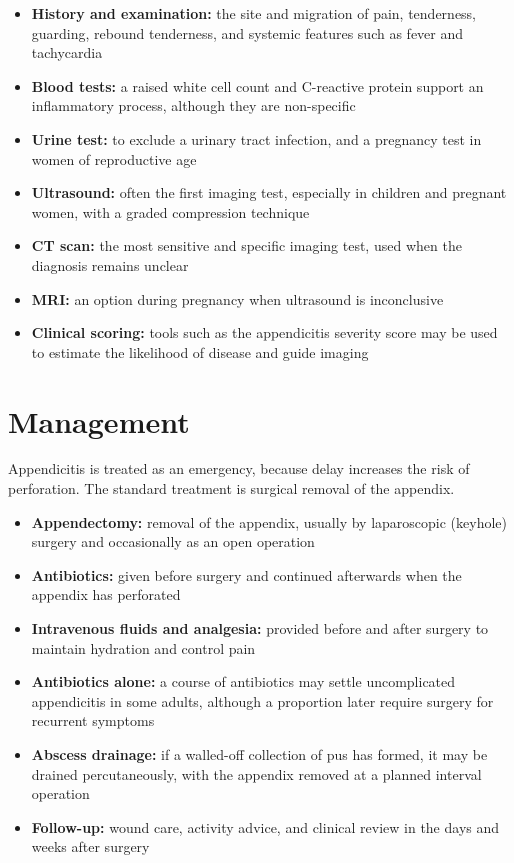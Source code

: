 \begin{itemize}
    \item \textbf{History and examination:} the site and migration of pain, tenderness, guarding, rebound tenderness, and systemic features such as fever and tachycardia
    \item \textbf{Blood tests:} a raised white cell count and C-reactive protein support an inflammatory process, although they are non-specific
    \item \textbf{Urine test:} to exclude a urinary tract infection, and a pregnancy test in women of reproductive age
    \item \textbf{Ultrasound:} often the first imaging test, especially in children and pregnant women, with a graded compression technique
    \item \textbf{CT scan:} the most sensitive and specific imaging test, used when the diagnosis remains unclear
    \item \textbf{MRI:} an option during pregnancy when ultrasound is inconclusive
    \item \textbf{Clinical scoring:} tools such as the appendicitis severity score may be used to estimate the likelihood of disease and guide imaging
\end{itemize}

\section*{Management}
Appendicitis is treated as an emergency, because delay increases the risk of perforation. The standard treatment is surgical removal of the appendix.

\begin{itemize}
    \item \textbf{Appendectomy:} removal of the appendix, usually by laparoscopic (keyhole) surgery and occasionally as an open operation
    \item \textbf{Antibiotics:} given before surgery and continued afterwards when the appendix has perforated
    \item \textbf{Intravenous fluids and analgesia:} provided before and after surgery to maintain hydration and control pain
    \item \textbf{Antibiotics alone:} a course of antibiotics may settle uncomplicated appendicitis in some adults, although a proportion later require surgery for recurrent symptoms
    \item \textbf{Abscess drainage:} if a walled-off collection of pus has formed, it may be drained percutaneously, with the appendix removed at a planned interval operation
    \item \textbf{Follow-up:} wound care, activity advice, and clinical review in the days and weeks after surgery
\end{itemize}

